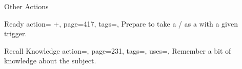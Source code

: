 \begin{PageBackLandscape}
\begin{TablesHalf}{\backTableHeight}
\begin{Table}{Other Actions}
            \begin{entry}{Ready}{%
                action= +,
                page=417,
                tags=\Concentrate,
            }
                Prepare to take a /\! as a  with a given trigger.
            \end{entry}
            \begin{entry}{Recall Knowledge}{%
                action=,
                page=231,
                tags=\Concentrate,
                uses={\VariousKnowledge[tags={S}]},
            }
                Remember a bit of knowledge about the subject.\hfill
                \quad
            \end{entry}
        \end{Table}
    \end{TablesHalf}%
\end{PageBackLandscape}




